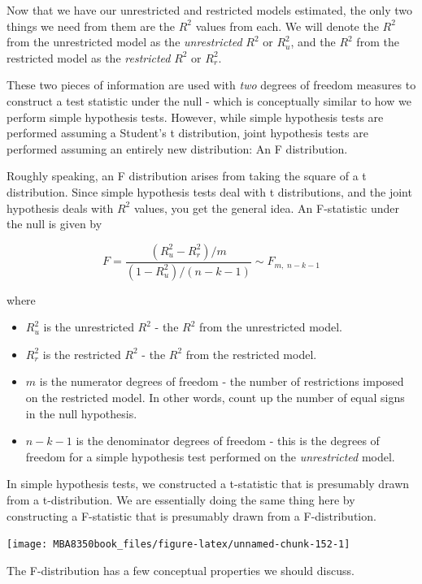 \documentclass[
]{book}
\begin{document}
Now that we have our unrestricted and restricted models estimated, the only two things we need from them are the \(R^2\) values from each. We will denote the \(R^2\) from the unrestricted model as the \emph{unrestricted} \(R^2\) or \(R^2_u\), and the \(R^2\) from the restricted model as the \emph{restricted} \(R^2\) or \(R^2_r\).

These two pieces of information are used with \emph{two} degrees of freedom measures to construct a test statistic under the null - which is conceptually similar to how we perform simple hypothesis tests. However, while simple hypothesis tests are performed assuming a Student's t distribution, joint hypothesis tests are performed assuming an entirely new distribution: An F distribution.

Roughly speaking, an F distribution arises from taking the square of a t distribution. Since simple hypothesis tests deal with t distributions, and the joint hypothesis deals with \(R^2\) values, you get the general idea. An F-statistic under the null is given by

\[F=\frac{(R^2_u - R^2_r)/m}{(1-R^2_u)/(n-k-1)} \sim F_{m,\;n-k-1}\]

where

\begin{itemize}
\item
  \(R^2_u\) is the unrestricted \(R^2\) - the \(R^2\) from the unrestricted model.
\item
  \(R^2_r\) is the restricted \(R^2\) - the \(R^2\) from the restricted model.
\item
  \(m\) is the numerator degrees of freedom - the number of restrictions imposed on the restricted model. In other words, count up the number of equal signs in the null hypothesis.
\item
  \(n-k-1\) is the denominator degrees of freedom - this is the degrees of freedom for a simple hypothesis test performed on the \emph{unrestricted} model.
\end{itemize}

In simple hypothesis tests, we constructed a t-statistic that is presumably drawn from a t-distribution. We are essentially doing the same thing here by constructing a F-statistic that is presumably drawn from a F-distribution.

\begin{center}\texttt{[image: MBA8350book\_files/figure-latex/unnamed-chunk-152-1]} \end{center}

The F-distribution has a few conceptual properties we should discuss.
\end{document}
